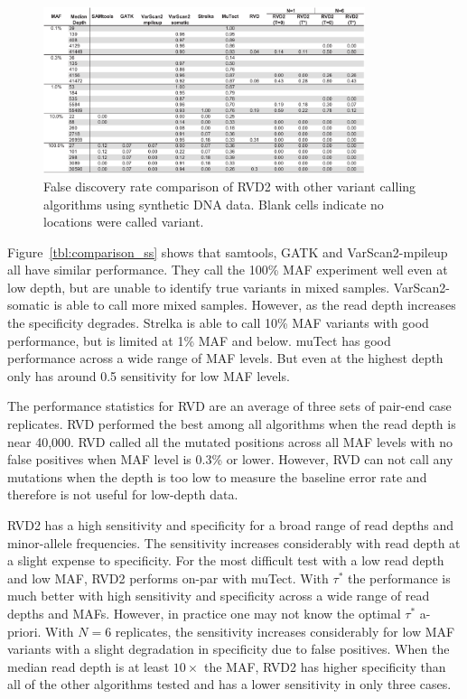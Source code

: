 \documentclass{bioinfo}
\begin{document}
\begin{figure}[!tbhp]
\centering
\includegraphics[width=0.84\textwidth]{pdf_figs/comparison_table_fdr.pdf}
\caption{False discovery rate comparison of RVD2 with other variant calling algorithms using synthetic DNA data. Blank cells indicate no locations were called variant.}
\vspace{-15pt}
\label{tbl:comparison_fdr}
\end{figure}

Figure~\ref{tbl:comparison_ss} shows that samtools, GATK and VarScan2-mpileup all have similar performance. 
They call the 100\% MAF experiment well even at low depth, but are unable to identify true variants in mixed samples. 
VarScan2-somatic is able to call more mixed samples. However, as the read depth increases the specificity degrades. 
Strelka is able to call 10\% MAF variants with good performance, but is limited at 1\% MAF and below. 
muTect has good performance across a wide range of MAF levels. 
But even at the highest depth only has around 0.5 sensitivity for low MAF levels.

The performance statistics for RVD are an average of three sets of pair-end case replicates. 
RVD performed the best among all algorithms when the read depth is near 40,000. 
RVD called all the mutated positions across all MAF levels with no false positives when MAF level is 0.3\% or lower. 
However, RVD can not call any mutations when the depth is too low to measure the baseline error rate and therefore is not useful for low-depth data.

RVD2 has a high sensitivity and specificity for a broad range of read depths and minor-allele frequencies. 
The sensitivity increases considerably with read depth at a slight expense to specificity. 
For the most difficult test with a low read depth and low MAF, RVD2 performs on-par with muTect. 
With $\tau^*$ the performance is much better with high sensitivity and specificity across a wide range of read depths and MAFs. 
However, in practice one may not know the optimal $\tau^*$ a-priori. 
With $N=6$ replicates, the sensitivity increases considerably for low MAF variants with a slight degradation in specificity due to false positives. 
When the median read depth is at least $10\times$ the MAF, RVD2 has higher specificity than all of the other algorithms tested and has a lower sensitivity in only three cases.
\end{document}
